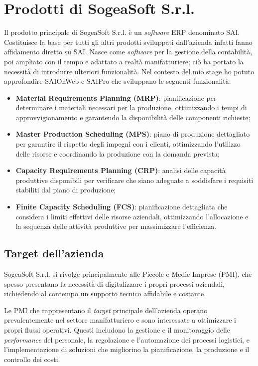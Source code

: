     \section{Prodotti di SogeaSoft S.r.l.}

    Il prodotto principale di SogeaSoft S.r.l. è un \textit{software} ERP denominato SAI. Costituisce la base per tutti gli altri prodotti sviluppati dall'azienda infatti fanno affidamento diretto su SAI. Nasce come \textit{software} per la gestione della contabilità, poi ampliato con il tempo e adattato a realtà manifatturiere; ciò ha portato la necessità di introdurre ulteriori funzionalità. 
    Nel contesto del mio stage ho potuto approfondire SAIOnWeb e SAIPro che sviluppano le seguenti funzionalità:
    \begin{itemize}
        \item \textbf{Material Requirements Planning (MRP)}: pianificazione per determinare i materiali necessari per la produzione, ottimizzando i tempi di approvvigionamento e garantendo la disponibilità delle componenti richieste;
        \item \textbf{Master Production Scheduling (MPS)}: piano di produzione dettagliato per garantire il rispetto degli impegni con i clienti, ottimizzando l’utilizzo delle risorse e coordinando la produzione con la domanda prevista;
        \item \textbf{Capacity Requirements Planning (CRP)}: analisi delle capacità produttive disponibili per verificare che siano adeguate a soddisfare i requisiti stabiliti dal piano di produzione;
        \item \textbf{Finite Capacity Scheduling (FCS)}: pianificazione dettagliata che considera i limiti effettivi delle risorse aziendali, ottimizzando l'allocazione e la sequenza delle attività produttive per massimizzare l'efficienza.       
    \end{itemize}
    
        \subsection{Target dell'azienda}
        SogeaSoft S.r.l. si rivolge principalmente alle Piccole e Medie Imprese (PMI), che spesso presentano la necessità di digitalizzare i propri processi aziendali, richiedendo al contempo un supporto tecnico affidabile e costante. 
        
        \vspace{0.2 em}
        
        \noindent Le PMI che rappresentano il \textit{target} principale dell’azienda operano prevalentemente nel settore manifatturiero e sono interessate a ottimizzare i propri flussi operativi. Questi includono la gestione e il monitoraggio delle \textit{performance} del personale, la regolazione e l’automazione dei processi logistici, e l’implementazione di soluzioni che migliorino la pianificazione, la produzione e il controllo dei costi.
        
